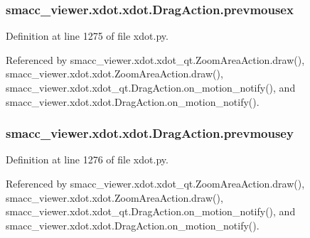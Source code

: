\subsubsection[{\texorpdfstring{prevmousex}{prevmousex}}]{\setlength{\rightskip}{0pt plus 5cm}smacc\+\_\+viewer.\+xdot.\+xdot.\+Drag\+Action.\+prevmousex}\hypertarget{classsmacc__viewer_1_1xdot_1_1xdot_1_1DragAction_ae2f5ec580e06a106adc68228092ee823}{}\label{classsmacc__viewer_1_1xdot_1_1xdot_1_1DragAction_ae2f5ec580e06a106adc68228092ee823}


Definition at line 1275 of file xdot.\+py.



Referenced by smacc\+\_\+viewer.\+xdot.\+xdot\+\_\+qt.\+Zoom\+Area\+Action.\+draw(), smacc\+\_\+viewer.\+xdot.\+xdot.\+Zoom\+Area\+Action.\+draw(), smacc\+\_\+viewer.\+xdot.\+xdot\+\_\+qt.\+Drag\+Action.\+on\+\_\+motion\+\_\+notify(), and smacc\+\_\+viewer.\+xdot.\+xdot.\+Drag\+Action.\+on\+\_\+motion\+\_\+notify().

\subsubsection[{\texorpdfstring{prevmousey}{prevmousey}}]{\setlength{\rightskip}{0pt plus 5cm}smacc\+\_\+viewer.\+xdot.\+xdot.\+Drag\+Action.\+prevmousey}\hypertarget{classsmacc__viewer_1_1xdot_1_1xdot_1_1DragAction_a6380280846ff6f59ec6283e10c01a293}{}\label{classsmacc__viewer_1_1xdot_1_1xdot_1_1DragAction_a6380280846ff6f59ec6283e10c01a293}


Definition at line 1276 of file xdot.\+py.



Referenced by smacc\+\_\+viewer.\+xdot.\+xdot\+\_\+qt.\+Zoom\+Area\+Action.\+draw(), smacc\+\_\+viewer.\+xdot.\+xdot.\+Zoom\+Area\+Action.\+draw(), smacc\+\_\+viewer.\+xdot.\+xdot\+\_\+qt.\+Drag\+Action.\+on\+\_\+motion\+\_\+notify(), and smacc\+\_\+viewer.\+xdot.\+xdot.\+Drag\+Action.\+on\+\_\+motion\+\_\+notify().

